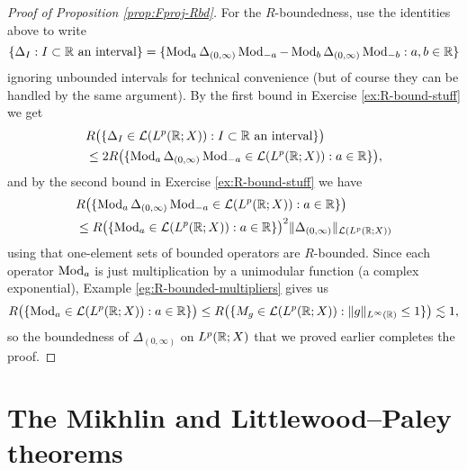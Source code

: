 \begin{proof}[Proof of Proposition \ref{prop:Fproj-Rbd}]
  For the $R$-boundedness, use the identities above to write
  \begin{equation*}
    \{\Delta_{I} : \text{$I \subset \mathbb{R}$ an interval}\}
    = \{\operatorname{Mod}_{a} \Delta_{(0,\infty)} \operatorname{Mod}_{-a} - \operatorname{Mod}_{b} \Delta_{(0,\infty)} \operatorname{Mod}_{-b} : a,b \in \mathbb{R}\} 
  \end{equation*}
  ignoring unbounded intervals for technical convenience (but of course they can be handled by the same argument).
  By the first bound in Exercise \eqref{ex:R-bound-stuff} we get
  \begin{equation*}
    \begin{aligned}
      &R\big( \{\Delta_{I} \in \mathcal{L}(L^p(\mathbb{R};X)) : \text{$I \subset \mathbb{R}$ an interval}\} \big) \\
      &\leq 2R\big( \{\operatorname{Mod}_{a} \Delta_{(0,\infty)} \operatorname{Mod}_{-a} \in \mathcal{L}(L^p(\mathbb{R};X)) : a \in \mathbb{R}\}  \big),
  \end{aligned}
  \end{equation*}
  and by the second bound in Exercise \eqref{ex:R-bound-stuff} we have
  \begin{equation*}
    \begin{aligned}
      &R\big( \{\operatorname{Mod}_{a} \Delta_{(0,\infty)} \operatorname{Mod}_{-a} \in \mathcal{L}(L^p(\mathbb{R};X)) : a \in \mathbb{R}\}  \big) \\
      &\leq R\big( \{ \operatorname{Mod}_{a} \in \mathcal{L}(L^p(\mathbb{R};X)) : a \in \mathbb{R} \} \big)^{2} \|\Delta_{(0,\infty)}\|_{\mathcal{L}(L^p(\mathbb{R};X))}
    \end{aligned}
  \end{equation*}
  using that one-element sets of bounded operators are $R$-bounded.
  Since each operator $\operatorname{Mod}_{a}$ is just multiplication by a unimodular function (a complex exponential), Example \eqref{eg:R-bounded-multipliers} gives us
  \begin{equation*}
    R\big( \{ \operatorname{Mod}_{a} \in \mathcal{L}(L^p(\mathbb{R};X)) : a \in \mathbb{R} \} \big)
    \leq R\big( \{ M_{g} \in \mathcal{L}(L^p(\mathbb{R};X))  : \|g\|_{L^\infty(\mathbb{R})} \leq 1\} \big) \lesssim 1,
\end{equation*}
so the boundedness of $\Delta_{(0,\infty)}$ on $L^p(\mathbb{R};X)$ that we proved earlier completes the proof.
\end{proof}


\section{The Mikhlin and Littlewood--Paley theorems}

